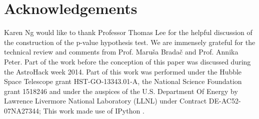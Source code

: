 \section{Acknowledgements}
Karen Ng would like to thank Professor Thomas Lee for the helpful discussion of 
the construction of the p-value hypothesis test. We are immensely grateful for 
the technical review and comments from Prof. Maru\v{s}a Brada\v{c} and Prof. Annika Peter.  
Part of the work before the conception of this paper was discussed during 
the AstroHack week 2014. 
Part of this work was performed under the Hubble Space Telescope grant
HST-GO-13343.01-A, the National Science Foundation grant 
1518246 and under the auspices of the U.S. Department Of Energy by 
Lawrence Livermore National Laboratory (LLNL) 
under Contract DE-AC52-07NA27344; 
This work made use of {\sc IPython}
\citep{Perez2007}.
